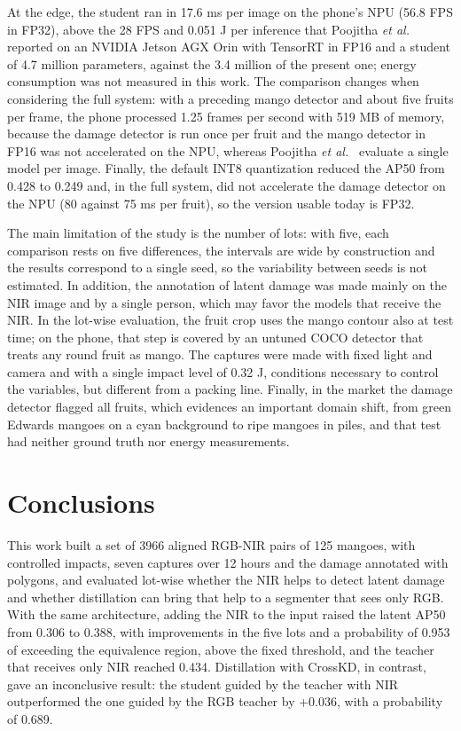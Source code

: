 \documentclass[journal]{IEEEtran}
\begin{document}
At the edge, the student ran in 17.6 ms per image on the phone's NPU (56.8 FPS in FP32), above the 28 FPS and 0.051 J per inference that Poojitha \emph{et al.}~\cite{poojitha2026} reported on an NVIDIA Jetson AGX Orin with TensorRT in FP16 and a student of 4.7 million parameters, against the 3.4 million of the present one; energy consumption was not measured in this work. The comparison changes when considering the full system: with a preceding mango detector and about five fruits per frame, the phone processed 1.25 frames per second with 519 MB of memory, because the damage detector is run once per fruit and the mango detector in FP16 was not accelerated on the NPU, whereas Poojitha \emph{et al.}~\cite{poojitha2026} evaluate a single model per image. Finally, the default INT8 quantization reduced the AP50 from 0.428 to 0.249 and, in the full system, did not accelerate the damage detector on the NPU (80 against 75 ms per fruit), so the version usable today is FP32.

The main limitation of the study is the number of lots: with five, each comparison rests on five differences, the intervals are wide by construction and the results correspond to a single seed, so the variability between seeds is not estimated. In addition, the annotation of latent damage was made mainly on the NIR image and by a single person, which may favor the models that receive the NIR. In the lot-wise evaluation, the fruit crop uses the mango contour also at test time; on the phone, that step is covered by an untuned COCO detector that treats any round fruit as mango. The captures were made with fixed light and camera and with a single impact level of 0.32 J, conditions necessary to control the variables, but different from a packing line. Finally, in the market the damage detector flagged all fruits, which evidences an important domain shift, from green Edwards mangoes on a cyan background to ripe mangoes in piles, and that test had neither ground truth nor energy measurements.

\section{Conclusions}\label{sec:conclusions}
This work built a set of 3966 aligned RGB-NIR pairs of 125 mangoes, with controlled impacts, seven captures over 12 hours and the damage annotated with polygons, and evaluated lot-wise whether the NIR helps to detect latent damage and whether distillation can bring that help to a segmenter that sees only RGB. With the same architecture, adding the NIR to the input raised the latent AP50 from 0.306 to 0.388, with improvements in the five lots and a probability of 0.953 of exceeding the equivalence region, above the fixed threshold, and the teacher that receives only NIR reached 0.434. Distillation with CrossKD, in contrast, gave an inconclusive result: the student guided by the teacher with NIR outperformed the one guided by the RGB teacher by +0.036, with a probability of 0.689.
\end{document}
